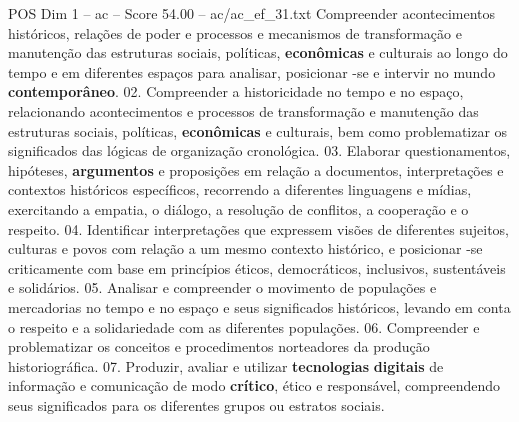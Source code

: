 \begin{textsample}{POS Dim 1 – ac – Score 54.00 – ac/ac\_ef\_31.txt}
Compreender acontecimentos históricos, relações de poder e processos e mecanismos de transformação e manutenção das estruturas sociais, políticas, \textbf{econômicas} e culturais ao longo do tempo e em diferentes espaços para analisar, posicionar -se e intervir no mundo \textbf{contemporâneo}. 02.
Compreender a historicidade no tempo e no espaço, relacionando acontecimentos e processos de transformação e manutenção das estruturas sociais, políticas, \textbf{econômicas} e culturais, bem como problematizar os significados das lógicas de organização cronológica. 03.
Elaborar questionamentos, hipóteses, \textbf{argumentos} e proposições em relação a documentos, interpretações e contextos históricos específicos, recorrendo a diferentes linguagens e mídias, exercitando a empatia, o diálogo, a resolução de conflitos, a cooperação e o respeito. 04.
Identificar interpretações que expressem visões de diferentes sujeitos, culturas e povos com relação a um mesmo contexto histórico, e posicionar -se criticamente com base em princípios éticos, democráticos, inclusivos, sustentáveis e solidários. 05.
Analisar e compreender o movimento de populações e mercadorias no tempo e no espaço e seus significados históricos, levando em conta o respeito e a solidariedade com as diferentes populações. 06.
Compreender e problematizar os conceitos e procedimentos norteadores da produção historiográfica. 07.
Produzir, avaliar e utilizar \textbf{tecnologias} \textbf{digitais} de informação e comunicação de modo \textbf{crítico}, ético e responsável, compreendendo seus significados para os diferentes grupos ou estratos sociais.

\end{textsample}
